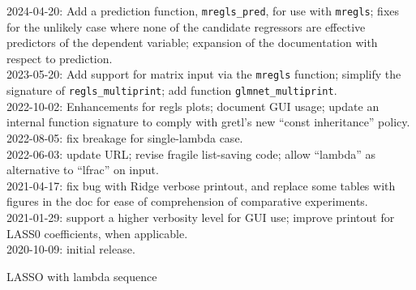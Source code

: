 \documentclass{article}
\begin{document}
2024-04-20: Add a prediction function, \texttt{mregls\_pred}, for use
with \texttt{mregls}; fixes for the unlikely case where none of the
candidate regressors are effective predictors of the dependent
variable; expansion of the documentation with respect to prediction.\\[4pt]
2023-05-20: Add support for matrix input via the \texttt{mregls}
function; simplify the signature of \texttt{regls\_multiprint};
add function \texttt{glmnet\_multiprint}.\\[4pt]
2022-10-02: Enhancements for regls plots; document GUI usage; update
an internal function signature to comply with gretl's
new ``const inheritance'' policy.\\[4pt]
2022-08-05: fix breakage for single-lambda case.\\[4pt]
2022-06-03: update URL; revise fragile list-saving code;
allow ``lambda'' as alternative to ``lfrac'' on input.\\[4pt]
2021-04-17: fix bug with Ridge verbose printout, and replace some
tables with figures in the doc for ease of comprehension
of comparative experiments.\\[4pt]
2021-01-29: support a higher verbosity level for GUI use;
improve printout for LASS0 coefficients, when applicable.\\[4pt]
2020-10-09: initial release.

\begin{script}
  \caption{LASSO with lambda sequence}
  \label{script:lamseq}
\end{script}
\end{document}
